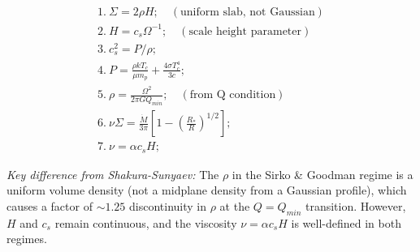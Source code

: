 \[
\begin{array}{l}
1.\ \Sigma = 2\rho H; \quad (\text{uniform slab, not Gaussian}) \\
2.\ H = c_s \Omega^{-1}; \quad (\text{scale height parameter}) \\
3.\ c_s^2 = P/\rho; \\
4.\ P = \frac{\rho k T_c}{\mu m_p} + \frac{4\sigma T_c^4}{3c}; \\
5.\ \rho = \frac{\Omega^2}{2\pi G Q_{min}}; \quad (\text{from Q condition}) \\
6.\ \nu\Sigma = \frac{\dot{M}}{3\pi} \left[ 1 - \left(\frac{R_*}{R}\right)^{1/2} \right]; \\
7.\ \nu = \alpha c_s H;
\end{array}
\]

\textit{Key difference from Shakura-Sunyaev:} The $\rho$ in the Sirko \& Goodman regime is a uniform
volume density (not a midplane density from a Gaussian profile), which causes a factor of $\sim 1.25$
discontinuity in $\rho$ at the $Q = Q_{min}$ transition. However, $H$ and $c_s$ remain continuous,
and the viscosity $\nu = \alpha c_s H$ is well-defined in both regimes.
